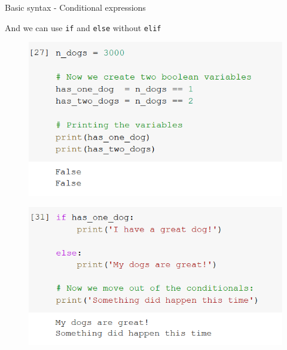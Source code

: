 \documentclass[aspectratio=169]{beamer}
\begin{document}
\begin{frame}{Basic syntax - Conditional expressions}

	And we can use \texttt{if} and \texttt{else} without \texttt{elif}

	\begin{multicols}{2}

		\begin{figure}
			\centering
			\includegraphics[width=\linewidth]{img/boolean_variables.png}
		\end{figure}
		\begin{figure}
			\centering
			\includegraphics[width=\linewidth]{img/if_else.png}
		\end{figure}

	\end{multicols}

\end{frame}
\end{document}
